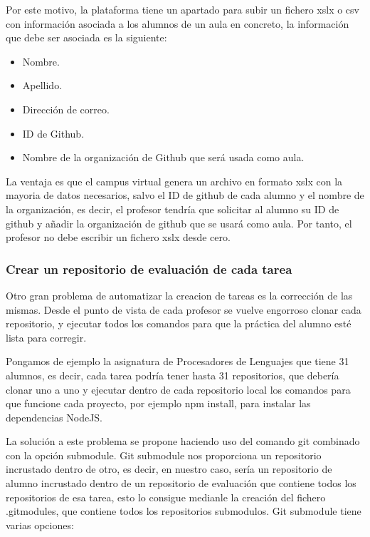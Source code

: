 Por este motivo, la plataforma tiene un apartado para subir un fichero xslx o csv con información asociada a los alumnos de un aula en concreto, la información que debe ser asociada es la siguiente:

\begin{itemize}
  \item Nombre.
  \item Apellido.
  \item Dirección de correo.
  \item ID de Github.
  \item Nombre de la organización de Github que será usada como aula.
\end{itemize}

La ventaja es que el campus virtual genera un archivo en formato xslx con la mayoria de datos necesarios, salvo el ID de github de cada alumno y el nombre de la organización, es decir, el profesor tendría que solicitar al alumno su ID de github y añadir la organización de github que se usará como aula.
Por tanto, el profesor no debe escribir un fichero xslx desde cero.

\subsubsection{Crear un repositorio de evaluación de cada tarea}

Otro gran problema de automatizar la creacion de tareas es la corrección de las mismas. Desde el punto de vista de cada profesor se vuelve engorroso clonar cada repositorio, y ejecutar todos los comandos para que la práctica del alumno esté lista para corregir.

Pongamos de ejemplo la asignatura de Procesadores de Lenguajes que tiene 31 alumnos, es decir, cada tarea podría tener hasta 31 repositorios, que debería clonar uno a uno y ejecutar dentro de cada repositorio local los comandos para que funcione cada proyecto, por ejemplo npm install, para instalar las dependencias NodeJS.

La solución a este problema se propone haciendo uso del comando git combinado con la opción submodule. Git submodule nos proporciona un repositorio incrustado dentro de otro, es decir, en nuestro caso, sería un repositorio de alumno incrustado dentro de un repositorio de evaluación que contiene todos los repositorios de esa tarea, esto lo consigue medianle la creación del fichero .gitmodules, que contiene todos los repositorios submodulos. Git submodule tiene varias opciones: 

